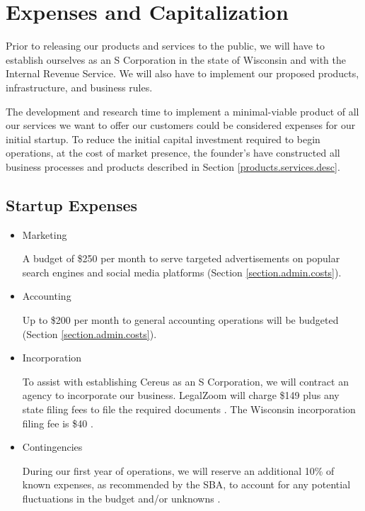 {\let\cleardoublepage\relax \chapter{Expenses and Capitalization}}

Prior to releasing our products and services to the public, we will have to establish ourselves as an S Corporation in the state of Wisconsin and with the Internal Revenue Service. We will also have to implement our proposed products, infrastructure, and business rules.

The development and research time to implement a minimal-viable product of all our services we want to offer our customers could be considered expenses for our initial startup. To reduce the initial capital investment required to begin operations, at the cost of market presence, the founder's have constructed all business processes and products described in Section \ref{products.services.desc}.

\section{Startup Expenses}

\begin{itemize}

\item Marketing

A budget of \$250 per month to serve targeted advertisements on popular search engines and social media platforms (Section \ref{section.admin.costs}).

\item Accounting

Up to \$200 per month to general accounting operations will be budgeted (Section \ref{section.admin.costs}). 

\item Incorporation

To assist with establishing Cereus as an S Corporation, we will contract an agency to incorporate our business. LegalZoom will charge \$149 plus any state filing fees to file the required documents \cite{legalzoom.2020}. The Wisconsin incorporation filing fee is \$40 \cite{wi.2018}.

\item Contingencies

During our first year of operations, we will reserve an additional 10\% of known expenses, as recommended by the SBA, to account for any potential fluctuations in the budget and/or unknowns \cite{sba.2020}.

\end{itemize}

